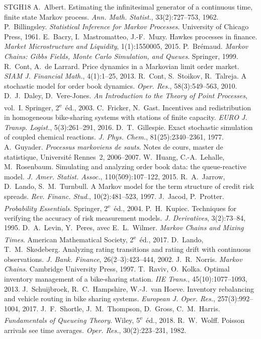 \documentclass[10pt,a4paper,twocolumn]{article}
\theoremstyle{enonce}
\theoremstyle{defi}
\begin{document}
\begin{thebibliography}{STGH18}
\small\sloppy\NoAutoSpacing
\setlength{\itemsep}{1pt}
 A.~Albert. Estimating the infinitesimal generator of a continuous time, finite state Markov process. \emph{Ann. Math. Statist.}, 33(2):727--753, 1962.
 P.~Billingsley. \emph{Statistical Inference for Markov Processes}. University of Chicago Press, 1961.
 E.~Bacry, I.~Mastromatteo, J.-F.~Muzy. Hawkes processes in finance. \emph{Market Microstructure and Liquidity}, 1(1):1550005, 2015.
 P.~Brémaud. \emph{Markov Chains: Gibbs Fields, Monte Carlo Simulation, and Queues}. Springer, 1999.
 R.~Cont, A.~de Larrard. Price dynamics in a Markovian limit order market. \emph{SIAM J. Financial Math.}, 4(1):1--25, 2013.
 R.~Cont, S.~Stoikov, R.~Talreja. A stochastic model for order book dynamics. \emph{Oper. Res.}, 58(3):549--563, 2010.
 D.~J.~Daley, D.~Vere-Jones. \emph{An Introduction to the Theory of Point Processes}, vol.~I. Springer, 2\textsuperscript{e}~éd., 2003.
 C.~Fricker, N.~Gast. Incentives and redistribution in homogeneous bike-sharing systems with stations of finite capacity. \emph{EURO J. Transp. Logist.}, 5(3):261--291, 2016.
 D.~T.~Gillespie. Exact stochastic simulation of coupled chemical reactions. \emph{J. Phys. Chem.}, 81(25):2340--2361, 1977.
 A.~Guyader. \emph{Processus markoviens de sauts}. Notes de cours, master de statistique, Université Rennes~2, 2006--2007.
 W.~Huang, C.-A.~Lehalle, M.~Rosenbaum. Simulating and analyzing order book data: the queue-reactive model. \emph{J. Amer. Statist. Assoc.}, 110(509):107--122, 2015.
 R.~A.~Jarrow, D.~Lando, S.~M.~Turnbull. A Markov model for the term structure of credit risk spreads. \emph{Rev. Financ. Stud.}, 10(2):481--523, 1997.
 J.~Jacod, P.~Protter. \emph{Probability Essentials}. Springer, 2\textsuperscript{e}~éd., 2004.
 P.~H.~Kupiec. Techniques for verifying the accuracy of risk measurement models. \emph{J. Derivatives}, 3(2):73--84, 1995.
 D.~A.~Levin, Y.~Peres, avec E.~L.~Wilmer. \emph{Markov Chains and Mixing Times}. American Mathematical Society, 2\textsuperscript{e}~éd., 2017.
 D.~Lando, T.~M.~Skødeberg. Analyzing rating transitions and rating drift with continuous observations. \emph{J. Bank. Finance}, 26(2--3):423--444, 2002.
 J.~R.~Norris. \emph{Markov Chains}. Cambridge University Press, 1997.
 T.~Raviv, O.~Kolka. Optimal inventory management of a bike-sharing station. \emph{IIE Trans.}, 45(10):1077--1093, 2013.
 J.~Schuijbroek, R.~C.~Hampshire, W.-J.~van Hoeve. Inventory rebalancing and vehicle routing in bike sharing systems. \emph{European J. Oper. Res.}, 257(3):992--1004, 2017.
 J.~F.~Shortle, J.~M.~Thompson, D.~Gross, C.~M.~Harris. \emph{Fundamentals of Queueing Theory}. Wiley, 5\textsuperscript{e}~éd., 2018.
 R.~W.~Wolff. Poisson arrivals see time averages. \emph{Oper. Res.}, 30(2):223--231, 1982.
\end{thebibliography}
\end{document}
